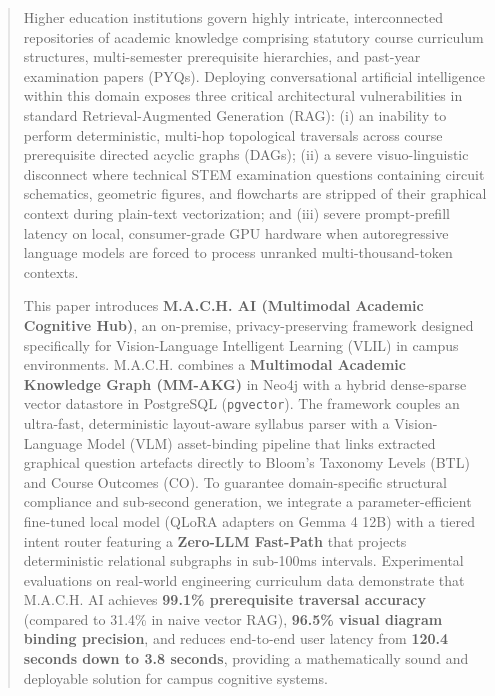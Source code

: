 \documentclass[conference]{IEEEtran}
\begin{document}
\maketitle

\begin{abstract}
Higher education institutions govern highly intricate, interconnected repositories of academic knowledge comprising statutory course curriculum structures, multi-semester prerequisite hierarchies, and past-year examination papers (PYQs). Deploying conversational artificial intelligence within this domain exposes three critical architectural vulnerabilities in standard Retrieval-Augmented Generation (RAG): (i) an inability to perform deterministic, multi-hop topological traversals across course prerequisite directed acyclic graphs (DAGs); (ii) a severe visuo-linguistic disconnect where technical STEM examination questions containing circuit schematics, geometric figures, and flowcharts are stripped of their graphical context during plain-text vectorization; and (iii) severe prompt-prefill latency on local, consumer-grade GPU hardware when autoregressive language models are forced to process unranked multi-thousand-token contexts. 

This paper introduces \textbf{M.A.C.H. AI (Multimodal Academic Cognitive Hub)}, an on-premise, privacy-preserving framework designed specifically for Vision-Language Intelligent Learning (VLIL) in campus environments. M.A.C.H. combines a \textbf{Multimodal Academic Knowledge Graph (MM-AKG)} in Neo4j with a hybrid dense-sparse vector datastore in PostgreSQL (\texttt{pgvector}). The framework couples an ultra-fast, deterministic layout-aware syllabus parser with a Vision-Language Model (VLM) asset-binding pipeline that links extracted graphical question artefacts directly to Bloom's Taxonomy Levels (BTL) and Course Outcomes (CO). To guarantee domain-specific structural compliance and sub-second generation, we integrate a parameter-efficient fine-tuned local model (QLoRA adapters on Gemma 4 12B) with a tiered intent router featuring a \textbf{Zero-LLM Fast-Path} that projects deterministic relational subgraphs in sub-100ms intervals. Experimental evaluations on real-world engineering curriculum data demonstrate that M.A.C.H. AI achieves \textbf{99.1\% prerequisite traversal accuracy} (compared to 31.4\% in naive vector RAG), \textbf{96.5\% visual diagram binding precision}, and reduces end-to-end user latency from \textbf{120.4 seconds down to 3.8 seconds}, providing a mathematically sound and deployable solution for campus cognitive systems.
\end{abstract}
\end{document}
